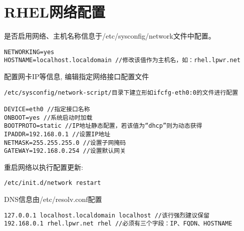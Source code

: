 \section{RHEL网络配置}


是否启用网络、主机名称信息于/etc/sysconfig/network文件中配置。
\begin{verbatim}
NETWORKING=yes
HOSTNAME=localhost.localdomain //修改该值作为主机名，如：rhel.lpwr.net
\end{verbatim}

配置网卡IP等信息, 编辑指定网络接口配置文件
\begin{verbatim}
/etc/sysconfig/network-script/目录下建立形如ifcfg-eth0:0的文件进行配置

DEVICE=eth0 //指定接口名称
ONBOOT=yes //系统启动时加载
BOOTPROTO=static //IP地址静态配置，若该值为“dhcp”则为动态获得
IPADDR=192.168.0.1 //设置IP地址
NETMASK=255.255.255.0 //设置子网掩码
GATEWAY=192.168.0.254 //设置默认网关
\end{verbatim}

重启网络以执行配置更新:

\begin{verbatim}
/etc/init.d/network restart
\end{verbatim}

DNS信息由/etc/resolv.conf配置
\begin{verbatim}
127.0.0.1 localhost.localdomain localhost //该行强烈建议保留
192.168.0.1 rhel.lpwr.net rhel //必须有三个字段：IP、FQDN、HOSTNAME
\end{verbatim}



